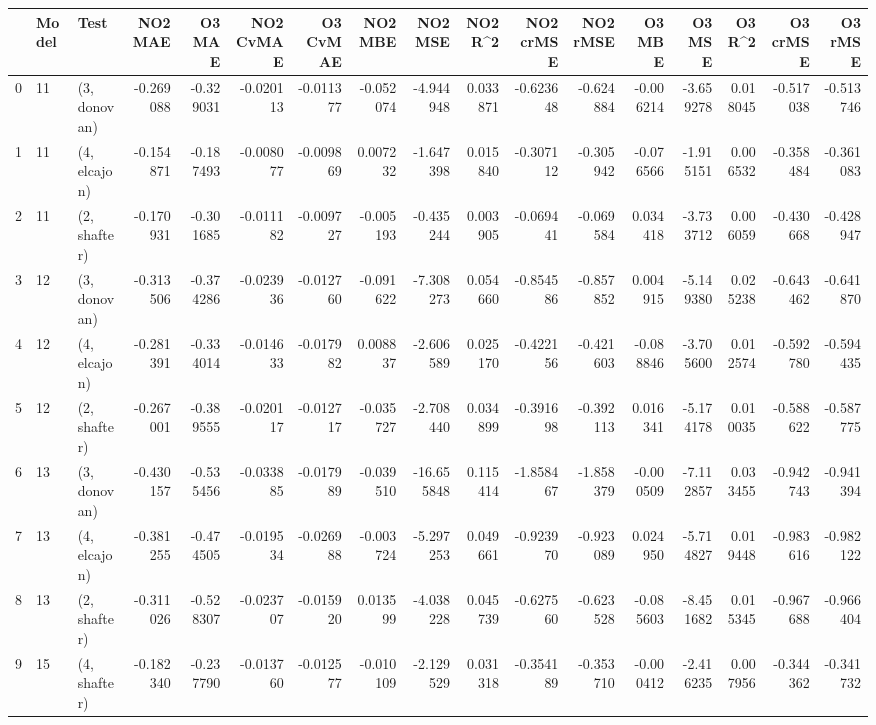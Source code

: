 \begin{tabular}{lllrrrrrrrrrrrrrr}
\toprule
{} & Model &          Test &   NO2 MAE &    O3 MAE &  NO2 CvMAE &  O3 CvMAE &   NO2 MBE &     NO2 MSE &   NO2 R\textasciicircum2 &  NO2 crMSE &  NO2 rMSE &    O3 MBE &     O3 MSE &    O3 R\textasciicircum2 &  O3 crMSE &   O3 rMSE \\
\midrule
0  &    11 &  (3, donovan) & -0.269088 & -0.329031 &  -0.020113 & -0.011377 & -0.052074 &   -4.944948 &  0.033871 &  -0.623648 & -0.624884 & -0.006214 &  -3.659278 &  0.018045 & -0.517038 & -0.513746 \\
1  &    11 &  (4, elcajon) & -0.154871 & -0.187493 &  -0.008077 & -0.009869 &  0.007232 &   -1.647398 &  0.015840 &  -0.307112 & -0.305942 & -0.076566 &  -1.915151 &  0.006532 & -0.358484 & -0.361083 \\
2  &    11 &  (2, shafter) & -0.170931 & -0.301685 &  -0.011182 & -0.009727 & -0.005193 &   -0.435244 &  0.003905 &  -0.069441 & -0.069584 &  0.034418 &  -3.733712 &  0.006059 & -0.430668 & -0.428947 \\
3  &    12 &  (3, donovan) & -0.313506 & -0.374286 &  -0.023936 & -0.012760 & -0.091622 &   -7.308273 &  0.054660 &  -0.854586 & -0.857852 &  0.004915 &  -5.149380 &  0.025238 & -0.643462 & -0.641870 \\
4  &    12 &  (4, elcajon) & -0.281391 & -0.334014 &  -0.014633 & -0.017982 &  0.008837 &   -2.606589 &  0.025170 &  -0.422156 & -0.421603 & -0.088846 &  -3.705600 &  0.012574 & -0.592780 & -0.594435 \\
5  &    12 &  (2, shafter) & -0.267001 & -0.389555 &  -0.020117 & -0.012717 & -0.035727 &   -2.708440 &  0.034899 &  -0.391698 & -0.392113 &  0.016341 &  -5.174178 &  0.010035 & -0.588622 & -0.587775 \\
6  &    13 &  (3, donovan) & -0.430157 & -0.535456 &  -0.033885 & -0.017989 & -0.039510 &  -16.655848 &  0.115414 &  -1.858467 & -1.858379 & -0.000509 &  -7.112857 &  0.033455 & -0.942743 & -0.941394 \\
7  &    13 &  (4, elcajon) & -0.381255 & -0.474505 &  -0.019534 & -0.026988 & -0.003724 &   -5.297253 &  0.049661 &  -0.923970 & -0.923089 &  0.024950 &  -5.714827 &  0.019448 & -0.983616 & -0.982122 \\
8  &    13 &  (2, shafter) & -0.311026 & -0.528307 &  -0.023707 & -0.015920 &  0.013599 &   -4.038228 &  0.045739 &  -0.627560 & -0.623528 & -0.085603 &  -8.451682 &  0.015345 & -0.967688 & -0.966404 \\
9  &    15 &  (4, shafter) & -0.182340 & -0.237790 &  -0.013760 & -0.012577 & -0.010109 &   -2.129529 &  0.031318 &  -0.354189 & -0.353710 & -0.000412 &  -2.416235 &  0.007956 & -0.344362 & -0.341732 \\

\end{tabular}
